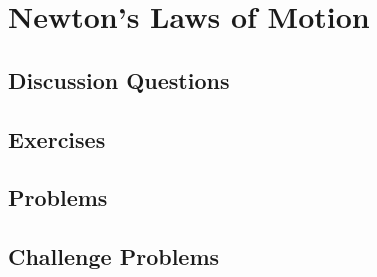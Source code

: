 
\chapter{Newton's Laws of Motion}

\section{Discussion Questions}


\section{Exercises}

\section{Problems}

\section{Challenge Problems}
